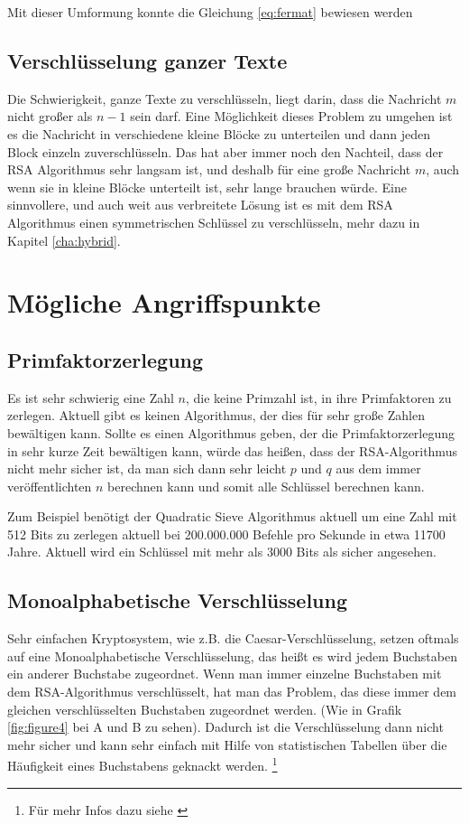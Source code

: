 \documentclass[12pt,a4paper]{scrartcl}
\begin{document}
	Mit dieser Umformung konnte die Gleichung \ref{eq:fermat} bewiesen werden 
	
	\subsection{Verschlüsselung ganzer Texte}
		\label{cha:hole_text}

	Die Schwierigkeit, ganze Texte zu verschlüsseln, liegt darin, dass die Nachricht $m$ nicht großer als $n - 1$ sein darf. Eine Möglichkeit dieses Problem zu umgehen ist es die Nachricht in verschiedene kleine Blöcke zu unterteilen und dann jeden Block einzeln zuverschlüsseln. Das hat aber immer noch den Nachteil, dass der RSA Algorithmus sehr langsam ist, und deshalb für eine große Nachricht $m$, auch wenn sie in kleine Blöcke unterteilt ist, sehr lange brauchen würde. Eine sinnvollere, und auch weit aus verbreitete Lösung ist es mit dem RSA Algorithmus einen symmetrischen Schlüssel zu verschlüsseln, mehr dazu in Kapitel \ref{cha:hybrid}.


\section{Mögliche Angriffspunkte}
	\subsection{Primfaktorzerlegung}
	Es ist sehr schwierig eine Zahl $n$, die keine Primzahl ist, in ihre Primfaktoren zu zerlegen. Aktuell gibt es keinen Algorithmus, der dies für sehr große Zahlen bewältigen kann. Sollte es einen Algorithmus geben, der die Primfaktorzerlegung in sehr kurze Zeit bewältigen kann, würde das heißen, dass der RSA-Algorithmus nicht mehr sicher ist, da man sich dann sehr leicht $p$ und $q$ aus dem immer veröffentlichten $n$ berechnen kann und somit alle Schlüssel berechnen kann.
	
	Zum Beispiel benötigt der Quadratic Sieve Algorithmus aktuell um eine Zahl mit 512 Bits zu zerlegen aktuell bei 200.000.000 Befehle pro Sekunde in etwa 11700 Jahre. \cite[S. 115]{Beutelspacher2015-jl}
	Aktuell wird ein Schlüssel mit mehr als 3000 Bits als sicher angesehen. \cite[29]{bsireco}
	 
	\subsection{Monoalphabetische Verschlüsselung}
	Sehr einfachen Kryptosystem, wie z.B. die Caesar-Verschlüsselung, setzen oftmals auf eine Monoalphabetische Verschlüsselung, das heißt es wird jedem Buchstaben ein anderer Buchstabe zugeordnet. Wenn man immer einzelne Buchstaben mit dem RSA-Algorithmus verschlüsselt, hat man das Problem, das diese immer dem gleichen verschlüsselten Buchstaben zugeordnet werden. (Wie in Grafik \ref{fig:figure4} bei A und B zu sehen). Dadurch ist die Verschlüsselung dann nicht mehr sicher und kann sehr einfach mit Hilfe von statistischen Tabellen über die Häufigkeit eines Buchstabens geknackt werden. \footnote{Für mehr Infos dazu siehe \cite{mono}}
	
\end{document}
